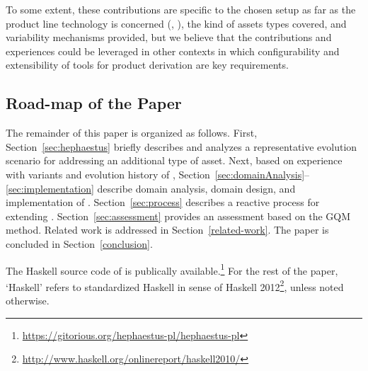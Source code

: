 To some extent, these contributions are specific to the chosen setup as far as the product line technology is concerned (\hp, \hpl), the kind of assets types covered, and variability mechanisms provided, but we believe that the contributions and experiences could be leveraged in other contexts in which configurability and extensibility of tools for product derivation are key requirements.


\subsection*{Road-map of the Paper}

The remainder of this paper is organized as follows. First, Section~\ref{sec:hephaestus} briefly describes \hp{} and analyzes a representative evolution scenario for addressing an additional type of asset. Next, based on experience with variants and evolution history of \hp, Section~\ref{sec:domainAnalysis}--\ref{sec:implementation} describe 
domain analysis, domain design, and implementation of \hpl. Section~\ref{sec:process} describes a reactive process for extending \hpl. Section~\ref{sec:assessment} provides an assessment \hpl{} based on the GQM method. Related work is addressed in Section~\ref{related-work}. The paper is concluded in Section~\ref{conclusion}. 

The Haskell source code of \hpl{} is publically available.\footnote{\url{https://gitorious.org/hephaestus-pl/hephaestus-pl}} For the rest of the paper, `Haskell' refers to standardized Haskell in sense of Haskell 2012\footnote{\url{http://www.haskell.org/onlinereport/haskell2010/}}, unless noted otherwise.

